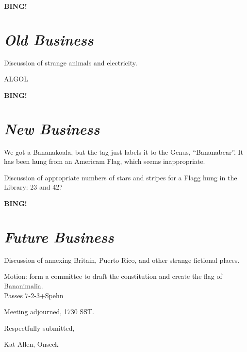 \documentclass[10pt]{article}
\newcommand{\bing}{{\bf BING!} }
\newcommand{\goto}[1]{\bing \vskip 12pt \section*{{\em{#1}}}}
\begin{document}
\goto{Old Business}
Discussion of strange animals and electricity.

ALGOL

\goto{New Business}
We got a Bananakoala, but the tag just labels it to the Genus,
``Bananabear''.  It has been hung from an Americam Flag, which seems inappropriate.

Discussion of appropriate numbers of stars and stripes for a Flagg
hung in the Library: 23 and 42?

\goto{Future Business}

Discussion of annexing Britain, Puerto Rico, and other strange
fictional places.

Motion: form a committee to draft the constitution and create the flag
of Bananimalia. \\
Passes 7-2-3+Spehn

\vspace{12pt}

\noindent
Meeting adjourned, 1730 SST.

\vspace{18pt}

\centerline{Respectfully submitted,}
\centerline{Kat Allen,  Onseck}
\end{document}
